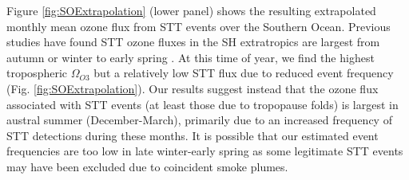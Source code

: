   
  Figure \ref{fig:SOExtrapolation} (lower panel) shows the resulting extrapolated monthly mean ozone flux from STT events over the Southern Ocean.
  Previous studies have found STT ozone fluxes in the SH extratropics are largest from autumn or winter to early spring \citep{Olsen2003, Liu2016}.
  At this time of year, we find the highest tropospheric $\Omega_{O3}$ but a relatively low STT flux due to reduced event frequency (Fig. \ref{fig:SOExtrapolation}).
  Our results suggest instead that the ozone flux associated with STT events (at least those due to tropopause folds) is largest in austral summer (December-March), primarily due to an increased frequency of STT detections during these months.
  It is possible that our estimated event frequencies are too low in late winter-early spring as some legitimate STT events may have been excluded due to coincident smoke plumes.
  
